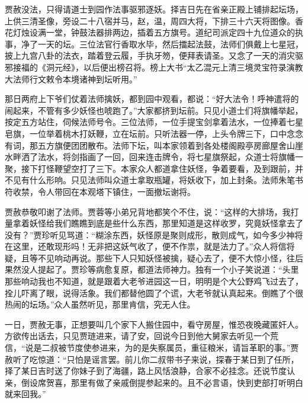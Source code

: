 \begin{parag}
    贾赦没法，只得请道士到园作法事驱邪逐妖。择吉日先在省亲正殿上铺排起坛场，上供三清圣像，旁设二十八宿并马，赵，温，周四大将，下排三十六天将图像。香花灯烛设满一堂，钟鼓法器排两边，插着五方旗号。道纪司派定四十九位道众的执事，净了一天的坛。三位法官行香取水毕，然后擂起法鼓，法师们俱戴上七星冠，披上九宫八卦的法衣，踏着登云履，手执牙笏，便拜表请圣。又念了一天的消灾驱邪接福的《洞元经》，以后便出榜召将。榜上大书“太乙混元上清三境灵宝符录演教大法师行文敕令本境诸神到坛听用。”
\end{parag}


\begin{parag}
    那日两府上下爷们仗着法师擒妖，都到园中观看，都说：“好大法令！呼神遣将的闹起来，不管有多少妖怪也唬跑了。”大家都挤到坛前。只见小道士们将旗幡举起，按定五方站住，伺候法师号令。三位法师，一位手提宝剑拿着法水，一位捧着七星皂旗，一位举着桃木打妖鞭，立在坛前。只听法器一停，上头令牌三下，口中念念有词，那五方旗便团团散布。法师下坛，叫本家领着到各处楼阁殿亭房廊屋舍山崖水畔洒了法水，将剑指画了一回，回来连击牌令，将七星旗祭起，众道士将旗幡一聚，接下打怪鞭望空打了三下。本家众人都道拿住妖怪，争着要看，及到跟前，并不见有什么形响。只见法师叫众道士拿取瓶罐，将妖收下，加上封条。法师朱笔书符收禁，令人带回在本观塔下镇住，一面撤坛谢将。
\end{parag}


\begin{parag}
    贾赦恭敬叩谢了法师。贾蓉等小弟兄背地都笑个不住，说：“这样的大排场，我打量拿着妖怪给我们瞧瞧到底是些什么东西，那里知道是这样收罗，究竟妖怪拿去了没有？”贾珍听见骂道：“糊涂东西，妖怪原是聚则成形，散则成气，如今多少神将在这里，还敢现形吗！无非把这妖气收了，便不作祟，就是法力了。”众人将信将疑，且等不见响动再说。那些下人只知妖怪被擒，疑心去了，便不大惊小怪，往后果然没人提起了。贾珍等病愈复原，都道法师神力。独有一个小子笑说道：“头里那些响动我也不知道，就是跟着大老爷进园这一日，明明是个大公野鸡飞过去了，拴儿吓离了眼，说得活象。我们都替他圆了个谎，大老爷就认真起来。倒瞧了个很热闹的坛场。”众人虽然听见，那里肯信，究无人住。
\end{parag}


\begin{parag}
    一日，贾赦无事，正想要叫几个家下人搬住园中，看守房屋，惟恐夜晚藏匿奸人。方欲传出话去，只见贾琏进来，请了安，回说今日到他大舅家去听见一个荒信，“说是二叔被节度使参进来，为的是失察属员，重征粮米，请旨革职的事。”贾赦听了吃惊道：“只怕是谣言罢。前儿你二叔带书子来说，探春于某日到了任所，择了某日吉时送了你妹子到了海疆，路上风恬浪静，合家不必挂念。还说节度认亲，倒设席贺喜，那里有做了亲戚倒提参起来的。且不必言语，快到吏部打听明白就来回我。”
\end{parag}


